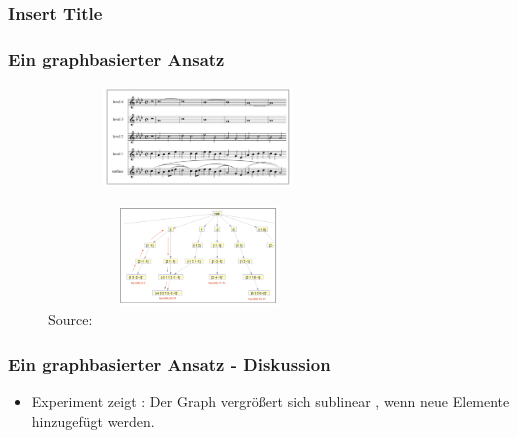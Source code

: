 \documentclass{beamer}
\begin{document}
	\begin{frame}
        \frametitle{Insert Title}
	\end{frame}



	\begin{frame}
		\frametitle{Ein graphbasierter Ansatz}
		\begin{figure}[h!]
					\includegraphics[width=300px,height=100px,keepaspectratio]{one_of_two_point_four}
		\end{figure}
		\begin{figure}[h!]
					\includegraphics[width=300px,height=100px,keepaspectratio]{two_of_two_point_four}
					\caption{Source: \cite{two_point_four}}

		\end{figure}
	\end{frame}


	\begin{frame}
		\frametitle{Ein graphbasierter Ansatz - Diskussion}
		\begin{itemize}
				\item Experiment zeigt : Der Graph vergrößert sich sublinear , wenn neue Elemente hinzugefügt werden.
		\end{itemize}
	\end{frame}
\end{document}

